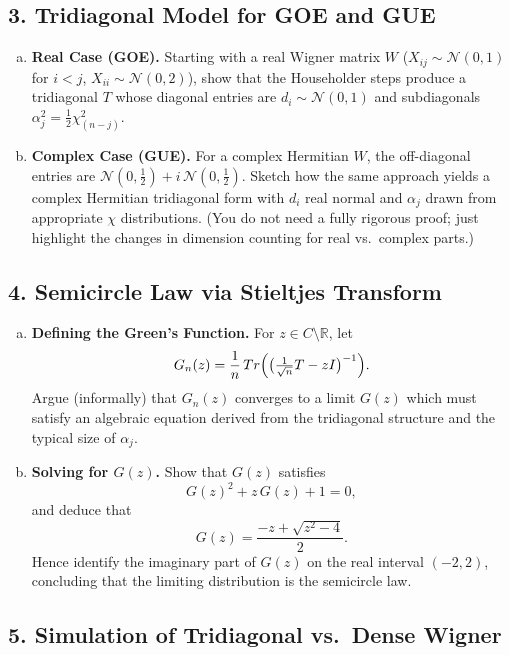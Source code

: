 \documentclass[letterpaper,11pt,oneside,reqno]{article}
\numberwithin{equation}{section}
\theoremstyle{definition}
\begin{document}
\subsection*{3. Tridiagonal Model for GOE and GUE}

\begin{enumerate}[(a)]
\item {\bf Real Case (GOE).} Starting with a real Wigner matrix $W$ ($X_{ij}\sim \mathcal{N}(0,1)$ for $i<j$, $X_{ii}\sim \mathcal{N}(0,2)$), show that the Householder steps produce a tridiagonal $T$ whose diagonal entries are $d_i\sim \mathcal{N}(0,1)$ and subdiagonals $\alpha_j^2 = \frac12 \chi^2_{(n-j)}$.
\item {\bf Complex Case (GUE).} For a complex Hermitian $W$, the off-diagonal entries are $\mathcal{N}(0,\tfrac12)+ i\,\mathcal{N}(0,\tfrac12)$. Sketch how the same approach yields a complex Hermitian tridiagonal form with $d_i$ real normal and $\alpha_j$ drawn from appropriate $\chi$ distributions. (You do not need a fully rigorous proof; just highlight the changes in dimension counting for real vs.\ complex parts.)
\end{enumerate}

\subsection*{4. Semicircle Law via Stieltjes Transform}

\begin{enumerate}[(a)]
\item {\bf Defining the Green’s Function.} For $z\in C\setminus\mathbb{R}$, let
\[
  G_n(z) = \frac{1}{n} \,Tr\Bigl(\bigl(\tfrac1{\sqrt{n}} T - z I\bigr)^{-1}\Bigr).
\]
Argue (informally) that $G_n(z)$ converges to a limit $G(z)$ which must satisfy an algebraic equation derived from the tridiagonal structure and the typical size of $\alpha_j$.
\item {\bf Solving for $G(z)$.} Show that $G(z)$ satisfies
\[
  G(z)^2 + z\,G(z) + 1 = 0,
\]
and deduce that
\[
  G(z) = \frac{-z + \sqrt{z^2-4}}{2}.
\]
Hence identify the imaginary part of $G(z)$ on the real interval $(-2,2)$, concluding that the limiting distribution is the semicircle law.
\end{enumerate}

\subsection*{5. Simulation of Tridiagonal vs.\ Dense Wigner}
\end{document}
